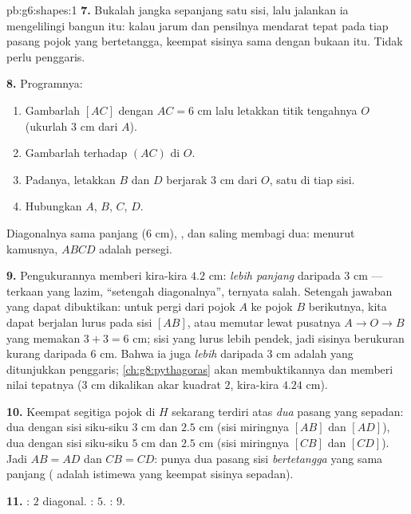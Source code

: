\begin{solution}{pb:g6:shapes:1}
\textbf{7.} Bukalah jangka sepanjang satu sisi, lalu jalankan ia
mengelilingi bangun itu: kalau jarum dan pensilnya mendarat tepat pada
tiap pasang pojok yang bertetangga, keempat sisinya sama dengan bukaan
itu. Tidak perlu penggaris.

\textbf{8.} Programnya:
\begin{enumerate}
  \item Gambarlah  $[AC]$ dengan $AC = 6$ cm lalu letakkan
        titik tengahnya $O$ (ukurlah $3$ cm dari $A$).
  \item Gambarlah  terhadap $(AC)$ di $O$.
  \item Padanya, letakkan $B$ dan $D$ berjarak $3$ cm dari $O$, satu
        di tiap sisi.
  \item Hubungkan $A$, $B$, $C$, $D$.
\end{enumerate}
Diagonalnya sama panjang ($6$ cm), , dan saling membagi
dua: menurut kamusnya, $ABCD$ adalah persegi.

\textbf{9.} Pengukurannya memberi kira-kira $4.2$ cm: \emph{lebih
panjang} daripada $3$ cm --- terkaan yang lazim, ``setengah
diagonalnya'', ternyata salah. Setengah jawaban yang dapat dibuktikan:
untuk pergi dari pojok $A$ ke pojok $B$ berikutnya, kita dapat
berjalan lurus pada sisi $[AB]$, atau memutar lewat pusatnya
$A \to O \to B$ yang memakan $3 + 3 = 6$ cm; sisi yang lurus lebih
pendek, jadi sisinya berukuran kurang daripada $6$ cm. Bahwa ia juga
\emph{lebih} daripada $3$ cm adalah yang ditunjukkan penggaris;
\cref{ch:g8:pythagoras} akan membuktikannya dan memberi nilai
tepatnya ($3$ cm dikalikan akar kuadrat $2$, kira-kira $4.24$ cm).

\textbf{10.} Keempat segitiga pojok di $H$ sekarang terdiri atas
\emph{dua} pasang yang sepadan: dua dengan sisi siku-siku $3$ cm dan
$2.5$ cm (sisi miringnya $[AB]$ dan $[AD]$), dua dengan sisi siku-siku
$5$ cm dan $2.5$ cm (sisi miringnya $[CB]$ dan $[CD]$). Jadi $AB = AD$
dan $CB = CD$:  punya dua pasang sisi \emph{bertetangga}
yang sama panjang ( adalah  istimewa yang
keempat sisinya sepadan).

\textbf{11.} : $2$ diagonal. : $5$.
: $9$.


\end{solution}
